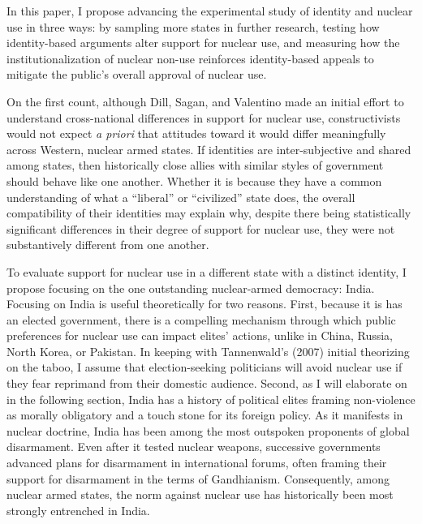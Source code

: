 \documentclass[12pt]{article}
\begin{document}
In this paper, I propose advancing the experimental study of identity and nuclear use in three ways: by sampling more states in further research, testing how identity-based arguments alter support for nuclear use, and measuring how the institutionalization of nuclear non-use reinforces identity-based appeals to mitigate the public's overall approval of nuclear use.

On the first count, although Dill, Sagan, and Valentino made an initial effort to understand cross-national differences in support for nuclear use, constructivists would not expect \textit{a priori} that attitudes toward it would differ meaningfully across Western, nuclear armed states. If identities are inter-subjective and shared among states, then historically close allies with similar styles of government should behave like one another. Whether it is because they have a common understanding of what a “liberal” or “civilized” state does, the overall compatibility of their identities may explain why, despite there being statistically significant differences in their degree of support for nuclear use, they were not substantively different from one another.

To evaluate support for nuclear use in a different state with a distinct identity, I propose focusing on the one outstanding nuclear-armed democracy: India. Focusing on India is useful theoretically for two reasons. First, because it is has an elected government, there is a compelling mechanism through which public preferences for nuclear use can impact elites' actions, unlike in China, Russia, North Korea, or Pakistan. In keeping with Tannenwald's (2007) initial theorizing on the taboo, I assume that election-seeking politicians will avoid nuclear use if they fear reprimand from their domestic audience. Second, as I will elaborate on in the following section, India has a history of political elites framing non-violence as morally obligatory and a touch stone for its foreign policy. As it manifests in nuclear doctrine, India has been among the most outspoken proponents of global disarmament. Even after it tested nuclear weapons, successive governments advanced plans for disarmament in international forums, often framing their support for disarmament in the terms of Gandhianism. Consequently, among nuclear armed states, the norm against nuclear use has historically been most strongly entrenched in India.
\end{document}
